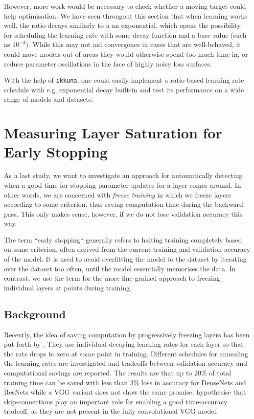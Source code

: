 However, more work would be necessary to check whether a moving target could
help optimisation. We have seen througout this section that  when learning works
well, the ratio decays similarly to a an exponential, which opens the
possibility for scheduling the learning rate with some decay function and a base
value (such as $10^{-3}$).  While this may not aid convergence in cases that are
well-behaved, it could move models out of areas they would otherwise spend too
much time in, or reduce parameter oscillations in the face of highly noisy loss
surfaces.

With the help of \texttt{ikkuna}, one could easily implement a ratio-based
learning rate schedule with e.g. exponential decay built-in and test its
performance on a wide range of models and datasets.

\section{Measuring Layer Saturation for Early Stopping}%
\label{sec:detecting_layer_saturation}

As a last study, we want to investigate an approach for automatically detecting
when a good time for stopping parameter updates for a layer comes around. In
other words, we are concerned with \emph{freeze training} in which we freeze
layers according to some criterion, thus saving computation time during the
backward pass. This only makes sense, however, if we do not lose validation
accuracy this way.

The term ``early stopping`` generally refers to halting training completely
based on some criterion, often derived from the current training and validation
accuracy of the model. It is used to avoid overfitting the model to the dataset
by iterating over the dataset too often, until the model essentially memorises
the data. In contrast, we use the term for the more fine-grained approach to
freezing individual layers at points during training.

\subsection{Background}%
\label{sub:saturation-background}

Recently, the idea of saving computation by progressively freezing layers has
been put forth by \citet{brock2017freezeout}. They use individual decaying
learning rates for each layer so that the rate drops to zero at some point in
training. Different schedules for annealing the learning rates are investigated
and tradeoffs between validation accuracy and computational savings are
reported. The results are that up to $20\%$ of total training time can be saved
with less than $3\%$ loss in accuracy for DenseNets \citep{huang2017densely} and
ResNets \citep{he2016deep} while a VGG variant does not show the same promise.
\citeauthor{brock2017freezeout} hypothesise that skip-connections play an
important role for enabling a good time-accuracy tradeoff, as they are not
present in the fully convolutional VGG model.

